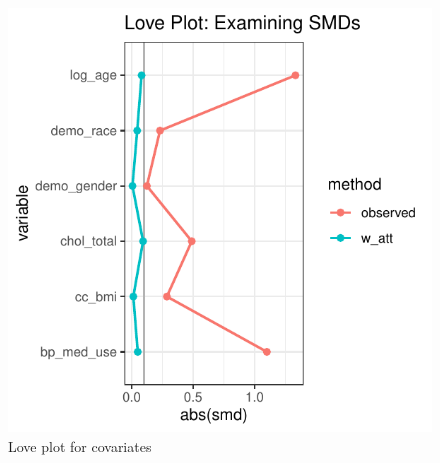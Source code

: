 \documentclass[useAMS,usenatbib,referee]{biom}
\begin{document}
\begin{figure}
\centering
\includegraphics{final-project_files/figure-latex/fig_love-1.pdf}
\caption{Love plot for covariates}
\end{figure}
\end{document}
